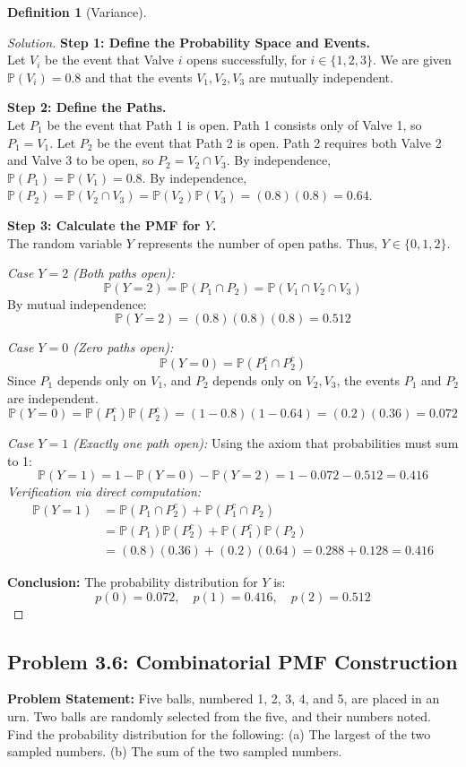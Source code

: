 \documentclass[11pt,letterpaper]{article}
\theoremstyle{definition}
\newtheorem{definition}{Definition}[section]
\theoremstyle{plain}
\theoremstyle{remark}
\newcommand{\Prob}{\mathbb{P}}
\begin{document}
\begin{definition}[Variance]
\begin{proof}[Solution]
\textbf{Step 1: Define the Probability Space and Events.}\\
Let $V_i$ be the event that Valve $i$ opens successfully, for $i \in \{1, 2, 3\}$. 
We are given $\Prob(V_i) = 0.8$ and that the events $V_1, V_2, V_3$ are mutually independent.

\textbf{Step 2: Define the Paths.}\\
Let $P_1$ be the event that Path 1 is open. Path 1 consists only of Valve 1, so $P_1 = V_1$.
Let $P_2$ be the event that Path 2 is open. Path 2 requires both Valve 2 and Valve 3 to be open, so $P_2 = V_2 \cap V_3$.
By independence, $\Prob(P_1) = \Prob(V_1) = 0.8$.
By independence, $\Prob(P_2) = \Prob(V_2 \cap V_3) = \Prob(V_2)\Prob(V_3) = (0.8)(0.8) = 0.64$.

\textbf{Step 3: Calculate the PMF for $Y$.}\\
The random variable $Y$ represents the number of open paths. Thus, $Y \in \{0, 1, 2\}$.

\textit{Case $Y = 2$ (Both paths open):}
\[ \Prob(Y = 2) = \Prob(P_1 \cap P_2) = \Prob(V_1 \cap V_2 \cap V_3) \]
By mutual independence:
\[ \Prob(Y = 2) = (0.8)(0.8)(0.8) = 0.512 \]

\textit{Case $Y = 0$ (Zero paths open):}
\[ \Prob(Y = 0) = \Prob(P_1^c \cap P_2^c) \]
Since $P_1$ depends only on $V_1$, and $P_2$ depends only on $V_2, V_3$, the events $P_1$ and $P_2$ are independent.
\[ \Prob(Y = 0) = \Prob(P_1^c) \Prob(P_2^c) = (1 - 0.8)(1 - 0.64) = (0.2)(0.36) = 0.072 \]

\textit{Case $Y = 1$ (Exactly one path open):}
Using the axiom that probabilities must sum to 1:
\[ \Prob(Y = 1) = 1 - \Prob(Y = 0) - \Prob(Y = 2) = 1 - 0.072 - 0.512 = 0.416 \]
\textit{Verification via direct computation:}
\begin{align*}
\Prob(Y = 1) &= \Prob(P_1 \cap P_2^c) + \Prob(P_1^c \cap P_2) \\
&= \Prob(P_1)\Prob(P_2^c) + \Prob(P_1^c)\Prob(P_2) \\
&= (0.8)(0.36) + (0.2)(0.64) = 0.288 + 0.128 = 0.416
\end{align*}

\textbf{Conclusion:} The probability distribution for $Y$ is:
\[ p(0) = 0.072, \quad p(1) = 0.416, \quad p(2) = 0.512 \]
\end{proof}

\subsection{Problem 3.6: Combinatorial PMF Construction}
\textbf{Problem Statement:} Five balls, numbered 1, 2, 3, 4, and 5, are placed in an urn. Two balls are randomly selected from the five, and their numbers noted. Find the probability distribution for the following:
(a) The largest of the two sampled numbers.
(b) The sum of the two sampled numbers.


\end{definition}
\end{document}
